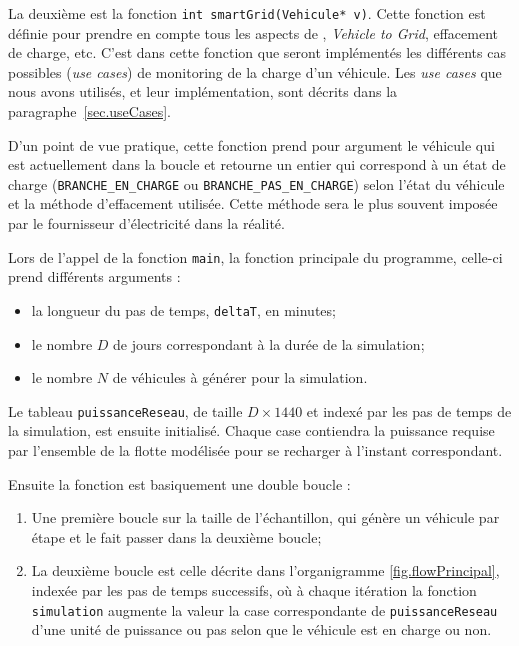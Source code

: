 			La deuxième est la fonction \lstinline{int smartGrid(Vehicule* v)}. Cette fonction est définie pour prendre en compte tous les aspects de \smartgrid{}, \emph{Vehicle to Grid}, effacement de charge, etc. C'est dans cette fonction que seront implémentés les différents cas possibles (\emph{use cases}) de monitoring de la charge d'un véhicule. Les \emph{use cases} que nous avons utilisés, et leur implémentation, sont décrits dans la paragraphe~\vref{sec.useCases}. 
			
			D'un point de vue pratique, cette fonction prend pour argument le véhicule qui est actuellement dans la boucle et retourne un entier qui correspond à un état de charge (\lstinline{BRANCHE_EN_CHARGE} ou \lstinline{BRANCHE_PAS_EN_CHARGE}) selon l'état du véhicule et la méthode d'effacement utilisée. Cette méthode sera le plus souvent imposée par le fournisseur d’électricité dans la réalité.
			
			\bigskip
			
			Lors de l'appel de la fonction \lstinline{main}, la fonction principale du programme, celle-ci prend différents arguments :
			\begin{itemize}
			\item la longueur du pas de temps, \lstinline{deltaT}, en minutes;
			\item le nombre $D$ de jours correspondant à la durée de la simulation;
			\item le nombre $N$ de véhicules à générer pour la simulation.
			\end{itemize}
			
			Le tableau \lstinline{puissanceReseau}, de taille $D \times 1440$ et indexé par les pas de temps de la simulation, est ensuite initialisé. Chaque case contiendra la puissance requise par l'ensemble de la flotte modélisée pour se recharger à l'instant correspondant.
			
			Ensuite la fonction est basiquement une double boucle :
			\begin{enumerate}
			\item Une première boucle sur la taille de l'échantillon, qui génère un véhicule par étape et le fait passer dans la deuxième boucle;
			\item La deuxième boucle est celle décrite dans l'organigramme \vref{fig.flowPrincipal}, indexée par les pas de temps successifs, où à chaque itération la fonction \lstinline{simulation} augmente la valeur la case correspondante de \lstinline{puissanceReseau} d'une unité de puissance ou pas selon que le véhicule est en charge ou non.
			\end{enumerate}
			
